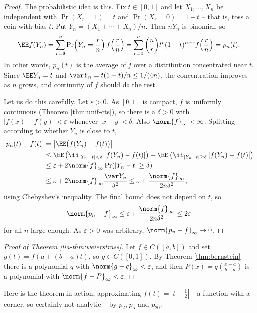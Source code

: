 \begin{proof}
	The probabilistic idea is this. Fix $t\in[0,1]$ and let $X_1,\ldots,X_n$ be independent with $\Pr(X_r=1)=t$ and $\Pr(X_r=0)=1-t$ -- that is, toss a coin with bias $t$. Put $Y_n = (X_1+\cdots+X_n)/n$. Then $nY_n$ is binomial, so
	$$\EE f(Y_n) = \sum_{r=0}^n \Pr\!\left(Y_n = \frac rn\right)f\!\left(\frac rn\right) = \sum_{r=0}^n\binom nr t^r(1-t)^{n-r}f\!\left(\frac rn\right) = p_n(t).$$
	In other words, $p_n(t)$ is the average of $f$ over a distribution concentrated near $t$. Since $\EE Y_n = t$ and $\var Y_n = t(1-t)/n \leq 1/(4n)$, the concentration improves as $n$ grows, and continuity of $f$ should do the rest.

	Let us do this carefully. Let $\varepsilon>0$. As $[0,1]$ is compact, $f$ is uniformly continuous (Theorem \ref{thm:unif-cts}), so there is a $\delta>0$ with $|f(x)-f(y)|<\varepsilon$ whenever $|x-y|<\delta$. Also $\norm{f}_\infty<\infty$. Splitting according to whether $Y_n$ is close to $t$,
	\begin{align*}
		|p_n(t)-f(t)| &= \left|\EE\big(f(Y_n)-f(t)\big)\right| \\
		&\leq \EE\left(\ii_{|Y_n-t|<\delta}\,|f(Y_n)-f(t)|\right) + \EE\left(\ii_{|Y_n-t|\geq\delta}\,|f(Y_n)-f(t)|\right)\\
		&\leq \varepsilon + 2\norm{f}_\infty\Pr(|Y_n-t|\geq\delta) \\
		&\leq \varepsilon + 2\norm{f}_\infty\frac{\var Y_n}{\delta^2} \leq \varepsilon + \frac{\norm{f}_\infty}{2n\delta^2},
	\end{align*}
	using Chebyshev's inequality. The final bound does not depend on $t$, so
	$$\norm{p_n-f}_\infty \leq \varepsilon + \frac{\norm{f}_\infty}{2n\delta^2} \leq 2\varepsilon$$
	for all $n$ large enough. As $\varepsilon>0$ was arbitrary, $\norm{p_n-f}_\infty\to0$.
\end{proof}

\begin{proof}[Proof of Theorem \ref{tia-thm:weierstrass}]
	Let $f\in C([a,b])$ and set $g(t) = f(a + (b-a)t)$, so $g \in C([0,1])$. By Theorem \ref{thm:bernstein} there is a polynomial $q$ with $\norm{g-q}_\infty<\varepsilon$, and then $P(x) = q\left(\frac{x-a}{b-a}\right)$ is a polynomial with $\norm{f-P}_\infty<\varepsilon$.
\end{proof}

Here is the theorem in action, approximating $f(t) = |t-\tfrac12|$ -- a function with a corner, so certainly not analytic -- by $p_2$, $p_5$ and $p_{20}$.

